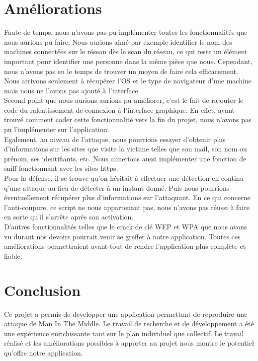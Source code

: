 \documentclass[11pt]{article}
\begin{document}
\section{Améliorations}
Faute de temps, nous n'avons pas pu implémenter toutes les fonctionnalités que nous aurions pu faire. Nous aurions aimé par exemple identifier le nom des machines connectées sur le réseau dès le scan du réseau, ce qui reste un élément important pour identifier une personne dans la même pièce que nous. Cependant, nous n'avons pas eu le temps de trouver un moyen de faire cela efficacement. Nous arrivons seulement à récupérer l'OS et le type de navigateur d'une machine mais nous ne l'avons pas ajouté à l'interface.~\\

Second point que nous aurions aurions pu améliorer, c'est le fait de rajouter le code du ralentissement de connexion à l'interface graphique. En effet, ayant trouvé comment coder cette fonctionnalité vers la fin du projet, nous n'avons pas pu l'implémenter sur l'application.~\\

Egalement, au niveau de l'attaque, nous pourrions essayer d'obtenir plus d'informations sur les sites que visite la victime telles que son mail, son nom ou prénom, ses identifiants, etc. Nous aimerions aussi implémenter une fonction de sniff fonctionnant avec les sites https.~\\

Pour la défense, il se trouve qu'on hésitait à effectuer une détection en continu q'une attaque au lieu de détecter à un instant donné. Puis nous pourrions éventuellement récupérer plus d'informations sur l'attaquant. En ce qui concerne l'anti-coupure, ce script ne nous appartenant pas, nous n'avons pas réussi à faire en sorte qu'il s'arrête après son activation.~\\

D'autres fonctionnalités telles que le crack de clé WEP et WPA que nous avons vu durant nos devoirs pourrait venir se greffer à notre application. Toutes ces améliorations permettraient avant tout de rendre l'application plus complète et fiable.

\section*{Conclusion}
Ce projet a permis de developper une application permettant de reproduire une attaque de Man In The Middle. Le travail de recherche et de développement a été une expérience enrichissante tant sur le plan individuel que collectif. Le travail réalisé et les améliorations possibles à apporter au projet nous montre le potentiel qu'offre notre application.
\newpage
\listoffigures
\lstlistoflistings
\end{document}
